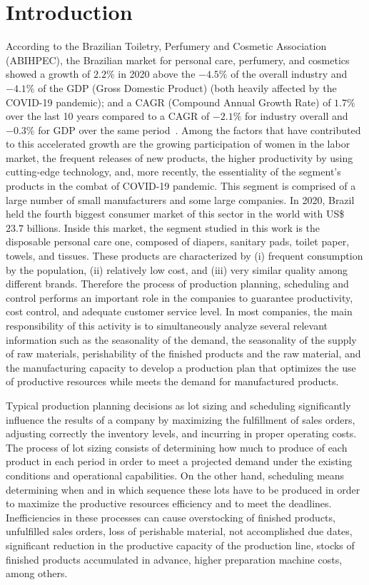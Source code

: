 \documentclass[11pt]{article}
\begin{document}
\section{Introduction}

According to the Brazilian Toiletry, Perfumery and Cosmetic Association (ABIHPEC), the Brazilian market for personal care, perfumery, and cosmetics showed a growth of $2.2\%$ in 2020 above the $-4.5\%$ of the overall industry and $-4.1\%$ of the GDP (Gross Domestic Product) (both heavily affected by the COVID-19 pandemic); and a CAGR (Compound Annual Growth Rate) of $1.7\%$ over the last 10 years compared to a CAGR of $-2.1\%$ for industry overall and $-0.3\%$ for GDP over the same period~\citep{abihpec}. Among the factors that have contributed to this accelerated growth are the growing participation of women in the labor market, the frequent releases of new products, the higher productivity by using cutting-edge technology, and, more recently, the essentiality of the segment's products in the combat of COVID-19 pandemic. This segment is comprised of a large number of small manufacturers and some large companies. In 2020, Brazil held the fourth biggest consumer market of this sector in the world with US\$~$23.7$ billions. Inside this market, the segment studied in this work is the disposable personal care one, composed of diapers, sanitary pads, toilet paper, towels, and tissues. These products are characterized by (i) frequent consumption by the population, (ii) relatively low cost, and (iii) very similar quality among different brands. Therefore the process of production planning, scheduling and control performs an important role in the companies to guarantee productivity, cost control, and adequate customer service level. In most companies, the main responsibility of this activity is to simultaneously analyze several relevant information such as the seasonality of the demand, the seasonality of the supply of raw materials, perishability of the finished products and the raw material, and the manufacturing capacity to develop a production plan that optimizes the use of productive resources while meets the demand for manufactured products.

Typical production planning decisions as lot sizing and scheduling significantly influence the results of a company by maximizing the fulfillment of sales orders, adjusting correctly the inventory levels, and incurring in proper operating costs. The process of lot sizing consists of determining how much to produce of each product in each period in order to meet a projected demand under the existing conditions and operational capabilities. On the other hand, scheduling means determining when and in which sequence these lots have to be produced in order to maximize the productive resources efficiency and to meet the deadlines. Inefficiencies in these processes can cause overstocking of finished products, unfulfilled sales orders, loss of perishable material, not accomplished due dates, significant reduction in the productive capacity of the production line, stocks of finished products accumulated in advance, higher preparation machine costs, among others.
\end{document}
